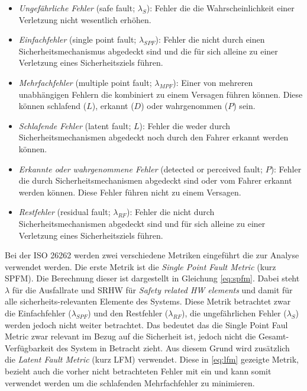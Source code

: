 \documentclass[a4paper,DIV=calc,ngerman]{scrartcl}
\begin{document}
\begin{itemize}
    \item \emph{Ungefährliche Fehler} (safe fault; $ \lambda_S $): Fehler die die Wahrscheinlichkeit einer Verletzung nicht wesentlich erhöhen.
    \item \emph{Einfachfehler} (single point fault; $ \lambda_{SPF} $): Fehler die nicht durch einen Sicherheitsmechanismus abgedeckt sind und die für sich alleine zu einer Verletzung eines Sicherheitsziels führen.
    \item \emph{Mehrfachfehler} (multiple point fault; $ \lambda_{MPF} $): Einer von mehreren unabhängigen Fehlern die kombiniert zu einem Versagen führen können. Diese können schlafend ($L$), erkannt ($D$) oder wahrgenommen ($P$) sein.
    \item \emph{Schlafende Fehler} (latent fault; $ L $): Fehler die weder durch Sicherheitsmechanismen abgedeckt noch durch den Fahrer erkannt werden können.
    \item \emph{Erkannte oder wahrgenommene Fehler} (detected or perceived fault; $ P $): Fehler die durch Sicherheitsmechanismen abgedeckt sind oder vom Fahrer erkannt werden können. Diese Fehler führen nicht zu einem Versagen.
    \item \emph{Restfehler} (residual fault; $ \lambda_{RF} $): Fehler die nicht durch Sicherheitsmechanismen abgedeckt sind und für sich alleine zu einer Verletzung eines Sicherheitsziels führen.
\end{itemize}

Bei der ISO 26262 werden zwei verschiedene Metriken eingeführt die zur Analyse verwendet werden. Die erste Metrik ist die \emph{Single Point Fault Metric} (kurz SPFM). Die Berechnung dieser ist dargestellt in Gleichung \ref{eq:spfm}. Dabei steht $ \lambda $ für die Ausfallrate und SRHW für \emph{Safety related HW elements} und damit für alle sicherheits-relevanten Elemente des Systems. Diese Metrik betrachtet zwar die Einfachfehler ($ \lambda_{SPF} $) und den Restfehler ($ \lambda_{RF} $), die ungefährlichen Fehler ($ \lambda_{S} $) werden jedoch nicht weiter betrachtet. Das bedeutet das die Single Point Faul Metric zwar relevant im Bezug auf die Sicherheit ist, jedoch nicht die Gesamt-Verfügbarkeit des System in Betracht zieht. Aus diesem Grund wird zusätzlich die \emph{Latent Fault Metric} (kurz LFM) verwendet. Diese in \ref{eq:lfm} gezeigte Metrik, bezieht auch die vorher nicht betrachteten Fehler mit ein und kann somit verwendet werden um die schlafenden Mehrfachfehler zu minimieren. 
\end{document}
